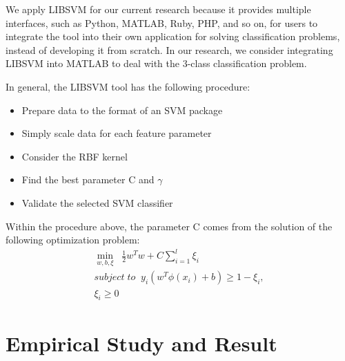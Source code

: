 We apply LIBSVM for our current research because it provides multiple interfaces, such as Python, MATLAB, Ruby, PHP, and so on, for users to integrate the tool into their own application for solving classification problems, instead of developing it from scratch. In our research, we consider integrating LIBSVM into MATLAB to deal with the 3-class classification problem.\par
In general, the LIBSVM tool has the following procedure:
\begin{itemize}
\item Prepare data to the format of an SVM package
\item Simply scale data for each feature parameter
\item Consider the RBF kernel
\item Find the best parameter C and $\gamma$
\item Validate the selected SVM classifier
\end{itemize}
Within the procedure above, the parameter C comes from the solution of the following optimization problem:
\begin{align}
    \min\limits_{w,b,\xi}\;\; \frac{1}{2}w^Tw + C\sum_{i=1}^{l}\xi_i\nonumber \\subject\;to\;\;y_i(w^T\phi(x_i)+b) \geq 1 - \xi_i,\\\xi_i\geq0\nonumber
\end{align}


\section{Empirical Study and Result}
